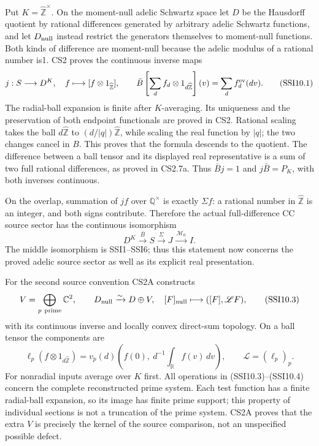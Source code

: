 Put \(K=\widehat{\mathbb Z}^{\times}\). On the moment-null adelic
Schwartz space let \(D\) be the Hausdorff quotient by rational
differences generated by arbitrary adelic Schwartz functions, and let
\(D_{\rm null}\) instead restrict the generators themselves to
moment-null functions. Both kinds of difference are moment-null because
the adelic modulus of a rational number is1. CS2 proves the continuous
inverse maps \[
j:S\longrightarrow D^K,\quad f\longmapsto[f\otimes1_{\widehat{\mathbb Z}}],
\qquad
\bar B\left[\sum_d f_d\otimes1_{d\widehat{\mathbb Z}}\right](v)
=\sum_d f_d^{\rm ev}(dv).
\tag{SSI10.1}
\] The radial-ball expansion is finite after \(K\)-averaging. Its
uniqueness and the preservation of both endpoint functionals are proved
in CS2. Rational scaling takes the ball \(d\widehat{\mathbb Z}\) to
\((d/|q|)\widehat{\mathbb Z}\), while scaling the real function by
\(|q|\); the two changes cancel in \(B\). This proves that the formula
descends to the quotient. The difference between a ball tensor and its
displayed real representative is a sum of two full rational differences,
as proved in CS2.7a. Thus \(\bar Bj=1\) and \(j\bar B=P_K\), with both
inverses continuous.

On the overlap, summation of \(jf\) over \(\mathbb Q^\times\) is exactly
\(\Sigma f\): a rational number in \(\widehat{\mathbb Z}\) is an
integer, and both signs contribute. Therefore the actual full-difference
CC source sector has the continuous isomorphism \[
D^K\xrightarrow{\ \bar B\ }S
\xrightarrow{\ \Sigma\ }J
\xrightarrow{\ \mathcal M_0\ }I.
\tag{SSI10.2}
\] The middle isomorphism is SSI1--SSI6; thus this statement now
concerns the proved adelic source sector as well as its explicit real
presentation.

For the second source convention CS2A constructs \[
V=\bigoplus_{p\ \mathrm{prime}}\mathbb C^2,
\qquad D_{\rm null}\xrightarrow{\sim}D\oplus V,
\quad[F]_{\rm null}\longmapsto([F],\mathscr LF),
\tag{SSI10.3}
\] with its continuous inverse and locally convex direct-sum topology.
On a ball tensor the components are \[
\ell_p(f\otimes1_{d\widehat{\mathbb Z}})
=v_p(d)\left(f(0),\ d^{-1}\int_{\mathbb R}f(v)\,dv\right),
\qquad \mathscr L=(\ell_p)_p.
\tag{SSI10.4}
\] For nonradial inputs average over \(K\) first. All operations in
(SSI10.3)--(SSI10.4) concern the complete reconstructed prime system.
Each test function has a finite radial-ball expansion, so its image has
finite prime support; this property of individual sections is not a
truncation of the prime system. CS2A proves that the extra \(V\) is
precisely the kernel of the source comparison, not an unspecified
possible defect.

